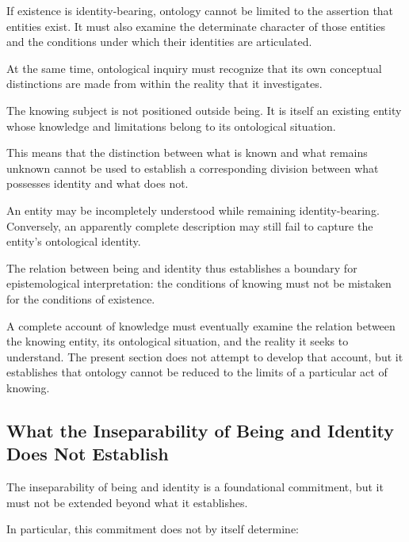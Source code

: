 If existence is identity-bearing, ontology
cannot be limited to the assertion that entities
exist. It must also examine the determinate
character of those entities and the conditions
under which their identities are articulated.

At the same time, ontological inquiry must
recognize that its own conceptual distinctions
are made from within the reality that it
investigates.

The knowing subject is not positioned outside
being. It is itself an existing entity whose
knowledge and limitations belong to its
ontological situation.

This means that the distinction between what
is known and what remains unknown cannot be
used to establish a corresponding division
between what possesses identity and what does
not.

An entity may be incompletely understood while
remaining identity-bearing. Conversely, an
apparently complete description may still fail
to capture the entity's ontological identity.

The relation between being and identity thus
establishes a boundary for epistemological
interpretation: the conditions of knowing
must not be mistaken for the conditions of
existence.

A complete account of knowledge must eventually
examine the relation between the knowing entity,
its ontological situation, and the reality it
seeks to understand. The present section does
not attempt to develop that account, but it
establishes that ontology cannot be reduced
to the limits of a particular act of knowing.



\subsection{What the Inseparability of Being and Identity Does Not Establish}
\label{subsec:limits-of-being-identity-inseparability}

The inseparability of being and identity is a
foundational commitment, but it must not be
extended beyond what it establishes.

In particular, this commitment does not by
itself determine:

